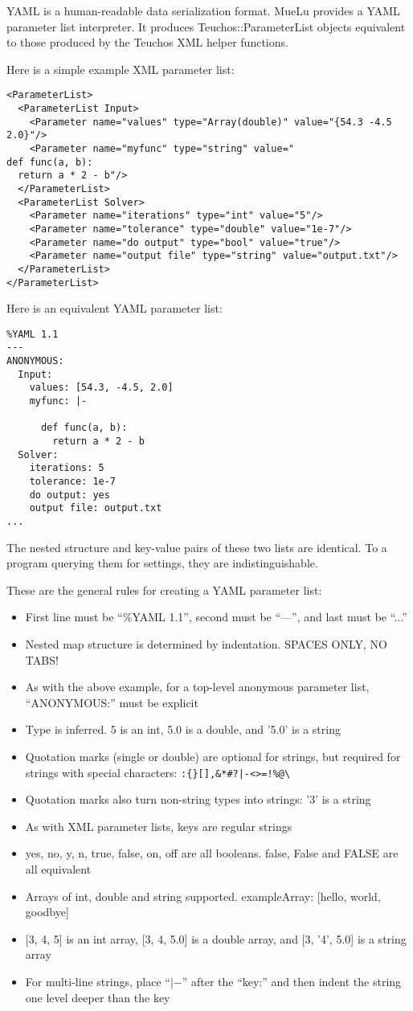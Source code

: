 \documentclass{article}
\begin{document}
YAML is a human-readable data serialization format. MueLu provides a
YAML parameter list interpreter. It produces Teuchos::ParameterList
objects equivalent to those produced by the Teuchos XML helper functions.

Here is a simple example XML parameter list:
\begin{verbatim}
<ParameterList>
  <ParameterList Input>
    <Parameter name="values" type="Array(double)" value="{54.3 -4.5 2.0}"/>
    <Parameter name="myfunc" type="string" value="
def func(a, b):
  return a * 2 - b"/>
  </ParameterList>
  <ParameterList Solver>
    <Parameter name="iterations" type="int" value="5"/>
    <Parameter name="tolerance" type="double" value="1e-7"/>
    <Parameter name="do output" type="bool" value="true"/>
    <Parameter name="output file" type="string" value="output.txt"/>
  </ParameterList>
</ParameterList>
\end{verbatim}

Here is an equivalent YAML parameter list:
\begin{verbatim}
%YAML 1.1
---
ANONYMOUS:
  Input:
    values: [54.3, -4.5, 2.0]
    myfunc: |-

      def func(a, b):
        return a * 2 - b
  Solver:
    iterations: 5
    tolerance: 1e-7
    do output: yes
    output file: output.txt
...
\end{verbatim}

The nested structure and key-value pairs of these two lists are identical.
To a program querying them for settings, they are indistinguishable.

These are the general rules for creating a YAML parameter list:
\begin{itemize}
\item First line must be ``\%YAML 1.1'', second must be ``---'', and last must be ``...''
\item Nested map structure is determined by indentation. SPACES ONLY, NO TABS!
\item As with the above example, for a top-level anonymous parameter list, ``ANONYMOUS:'' must be explicit
\item Type is inferred. 5 is an int, 5.0 is a double, and '5.0' is a string
\item Quotation marks (single or double) are optional for strings, but required for strings with special characters: \verb.:{}[],&*#?|-<>=!%@\.
\item Quotation marks also turn non-string types into strings: '3' is a string
\item As with XML parameter lists, keys are regular strings
\item yes, no, y, n, true, false, on, off are all booleans. false, False and FALSE are all equivalent
\item Arrays of int, double and string supported. exampleArray: {[}hello, world, goodbye{]}
\item {[}3, 4, 5{]} is an int array, {[}3, 4, 5.0{]} is a double array, and {[}3, '4', 5.0{]} is a string array
\item For multi-line strings, place ``$|-$'' after the ``key:'' and then indent the string one level deeper than the key
\end{itemize}
\end{document}
